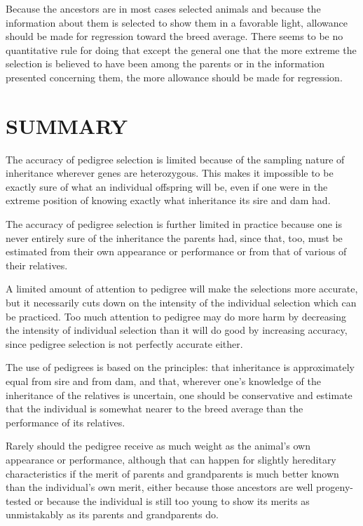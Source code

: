 Because the ancestors are in most cases selected animals and
because the information about them is selected to show them in a favorable
light, allowance should be made for regression toward the breed
average. There seems to be no quantitative rule for doing that except
the general one that the more extreme the selection is believed to have
been among the parents or in the information presented concerning
them, the more allowance should be made for regression.
\nowidow

\section*{SUMMARY}

The accuracy of pedigree selection is limited because of the sampling
nature of inheritance wherever genes are heterozygous. This
makes it impossible to be exactly sure of what an individual offspring
will be, even if one were in the extreme position of knowing exactly
what inheritance its sire and dam had.

The accuracy of pedigree selection is further limited in practice
because one is never entirely sure of the inheritance the parents had,
since that, too, must be estimated from their own appearance or performance
or from that of various of their relatives.

A limited amount of attention to pedigree will make the selections
more accurate, but it necessarily cuts down on the intensity of the individual
selection which can be practiced. Too much attention to pedigree
may do more harm by decreasing the intensity of individual
selection than it will do good by increasing accuracy, since pedigree
selection is not perfectly accurate either.

The use of pedigrees is based on the principles: that inheritance is
approximately equal from sire and from dam, and that, wherever one's
knowledge of the inheritance of the relatives is uncertain, one should be
conservative and estimate that the individual is somewhat nearer to the
breed average than the performance of its relatives.

Rarely should the pedigree receive as much weight as the animal's
own appearance or performance, although that can happen for slightly
hereditary characteristics if the merit of parents and grandparents is
much better known than the individual's own merit, either because
those ancestors are well progeny-tested or because the individual is still
too young to show its merits as unmistakably as its parents and grandparents
do.

